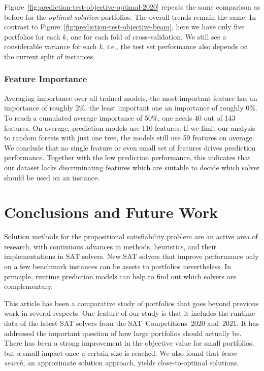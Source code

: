 \documentclass[runningheads]{llncs}
\begin{document}
Figure~\ref{fig:prediction-test-objective-optimal-2020} repeats the same comparison as before for the \emph{optimal solution} portfolios.
The overall trends remain the same.
In contrast to Figure~\ref{fig:prediction-test-objective-beam}, here we have only five portfolios for each $k$, one for each fold of cross-validation.
We still see a considerable variance for each $k$, i.e., the test set performance also depends on the current split of instances.

\subsubsection{Feature Importance}

Averaging importance over all trained models, the most important feature has an importance of roughly 2\%, the least important one an importance of roughly 0\%.
To reach a cumulated average importance of 50\%, one needs 40 out of 143 features.
On average, prediction models use 110 features.
If we limit our analysis to random forests with just one tree, the models still use 59 features on average.
We conclude that no single feature or even small set of features drives prediction performance.
Together with the low prediction performance, this indicates that our dataset lacks discriminating features which are suitable to decide which solver should be used on an instance.

\section{Conclusions and Future Work}
\label{sec:conclusion}

Solution methods for the propositional satisfiability problem are an active area of research, with continuous advances in methods, heuristics, and their implementations in SAT solvers. 
New SAT solvers that improve performance only on a few benchmark instances can be assets to portfolios nevertheless. 
In principle, runtime prediction models can help to find out which solvers are complementary. 

This article has been a comparative study of portfolios that goes beyond previous work in several respects.
One feature of our study is that it includes the runtime data of the latest SAT solvers from the SAT~Competitions~2020 and~2021. 
It has addressed the important question of how large portfolios should actually be.
There has been a strong improvement in the objective value for small portfolios, but a small impact once a certain size is reached. 
We also found that \emph{beam search}, an approximate solution approach, yields close-to-optimal solutions.
\end{document}
